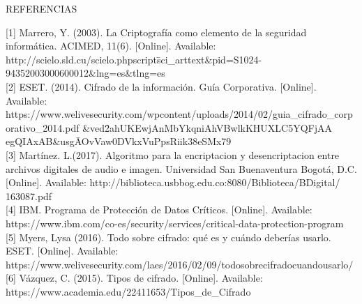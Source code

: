 \documentclass[9pt,24pt,twocolumn]{article}
\begin{document}
\begin{center}
{REFERENCIAS}
\end{center}

{[1] Marrero, Y. (2003). La Criptografía como elemento de la seguridad informática. ACIMED, 11(6). [Online]. Available: }
{http://scielo.sld.cu/scielo.php\?script\=sci_arttext\&pid=S1024-94352003000600012\&lng=es\&tlng=es}
\\

{[2] ESET. (2014). Cifrado de la información. Guía Corporativa. [Online]. Available: }
{https://www.welivesecurity.com/wp\-content/uploads/2014/02/guia\_cifrado\_corporativo\_2014.pdf}
{\&ved\=2ahUKEwjAnMbYkqniAhVBwlkKHUXLC5YQFjAA}
{egQIAxAB\&usg\=AOvVaw0DVkxVuPpsRiik38eSMx79}
\\

{[3] Martínez. L.(2017). Algoritmo para la encriptacion y desencriptacion entre archivos digitales de audio e imagen. Universidad San Buenaventura Bogotá, D.C. [Online]. Available: }
{http://biblioteca.usbbog.edu.co:8080/Biblioteca/BDigital/}
{163087.pdf}
\\

{[4] IBM. Programa de Protección de Datos Críticos. [Online]. Available:}
{https://www.ibm.com/co-es/security/services/critical-data-protection-program}
\\

{[5] Myers, Lysa (2016). Todo sobre cifrado: qué es y cuándo deberías usarlo. ESET. [Online]. Available:}
{https://www.welivesecurity.com/la\-es/2016/02/09/todo\-sobre\-cifrado\-cuando\-usarlo/}
\\

{[6] Vázquez, C. (2015). Tipos de cifrado. [Online]. Available:}
{https://www.academia.edu/22411653/Tipos\_de\_Cifrado}
\end{document}
